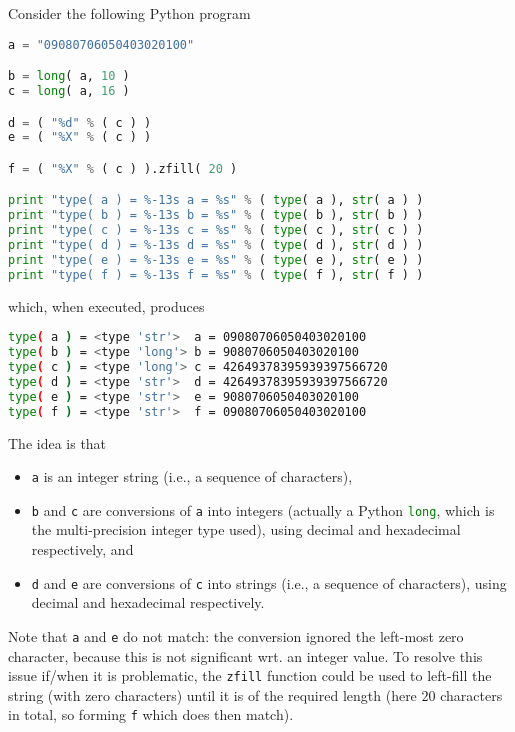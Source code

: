 Consider the following Python program
 
\begin{lstlisting}[language={Python}]
a = "09080706050403020100"

b = long( a, 10 )
c = long( a, 16 )

d = ( "%d" % ( c ) )
e = ( "%X" % ( c ) )

f = ( "%X" % ( c ) ).zfill( 20 )

print "type( a ) = %-13s a = %s" % ( type( a ), str( a ) )
print "type( b ) = %-13s b = %s" % ( type( b ), str( b ) )
print "type( c ) = %-13s c = %s" % ( type( c ), str( c ) )
print "type( d ) = %-13s d = %s" % ( type( d ), str( d ) )
print "type( e ) = %-13s e = %s" % ( type( e ), str( e ) )
print "type( f ) = %-13s f = %s" % ( type( f ), str( f ) )
\end{lstlisting}
 
\noindent
which, when executed, produces
 
\begin{lstlisting}[language={bash}]
type( a ) = <type 'str'>  a = 09080706050403020100
type( b ) = <type 'long'> b = 9080706050403020100
type( c ) = <type 'long'> c = 42649378395939397566720
type( d ) = <type 'str'>  d = 42649378395939397566720
type( e ) = <type 'str'>  e = 9080706050403020100
type( f ) = <type 'str'>  f = 09080706050403020100
\end{lstlisting}
 
\noindent
The idea is that
 
\begin{itemize}
\item \lstinline[language={Python}]|a| is an
      integer string
      (i.e., a sequence of characters),
\item \lstinline[language={Python}]|b| 
      and 
      \lstinline[language={Python}]|c|
      are conversions of 
      \lstinline[language={Python}]|a| 
      into
      integers
      (actually a Python \lstinline[language={Python}]|long|, which is the multi-precision integer type used),
      using decimal and hexadecimal respectively,
      and
\item \lstinline[language={Python}]|d| 
      and
      \lstinline[language={Python}]|e|
      are conversions of 
      \lstinline[language={Python}]|c| 
      into
      strings
      (i.e., a sequence of characters),
      using decimal and hexadecimal respectively.
\end{itemize}
 
\noindent
Note that 
\lstinline[language={Python}]|a| 
and 
\lstinline[language={Python}]|e| do not match: the conversion ignored
the left-most zero character, because this is not significant wrt. an
integer value.  To resolve this issue if/when it is problematic, the
\lstinline[language={Python}]|zfill| 
function could be used to left-fill the string (with zero characters)
until it is of the required length (here $20$ characters in total, so
forming 
\lstinline[language={Python}]|f| 
which does then match).
